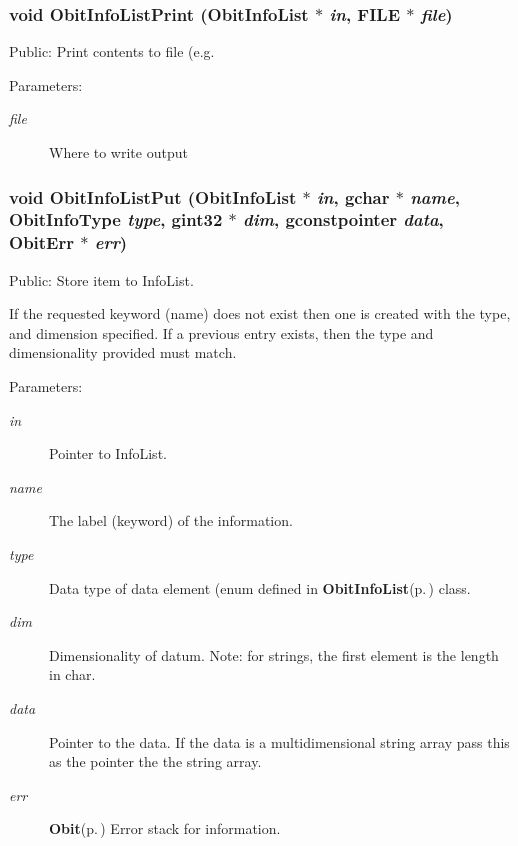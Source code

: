 \subsubsection{\setlength{\rightskip}{0pt plus 5cm}void Obit\-Info\-List\-Print ({\bf Obit\-Info\-List} $\ast$ {\em in}, FILE $\ast$ {\em file})}\label{ObitInfoList_8c_a22}


Public: Print contents to file (e.g. 

\begin{Desc}
\item[Parameters:]
\begin{description}
\item[{\em file}]Where to write output \end{description}
\end{Desc}
\subsubsection{\setlength{\rightskip}{0pt plus 5cm}void Obit\-Info\-List\-Put ({\bf Obit\-Info\-List} $\ast$ {\em in}, gchar $\ast$ {\em name}, Obit\-Info\-Type {\em type}, gint32 $\ast$ {\em dim}, gconstpointer {\em data}, {\bf Obit\-Err} $\ast$ {\em err})}\label{ObitInfoList_8c_a12}


Public: Store item to Info\-List. 

If the requested keyword (name) does not exist then one is created with the type, and dimension specified. If a previous entry exists, then the type and dimensionality provided must match. \begin{Desc}
\item[Parameters:]
\begin{description}
\item[{\em in}]Pointer to Info\-List. \item[{\em name}]The label (keyword) of the information. \item[{\em type}]Data type of data element (enum defined in {\bf Obit\-Info\-List}{\rm (p.\,\pageref{structObitInfoList})} class. \item[{\em dim}]Dimensionality of datum. Note: for strings, the first element is the length in char. \item[{\em data}]Pointer to the data. If the data is a multidimensional string array pass this as the pointer the the string array. \item[{\em err}]{\bf Obit}{\rm (p.\,\pageref{structObit})} Error stack for information. \end{description}
\end{Desc}
